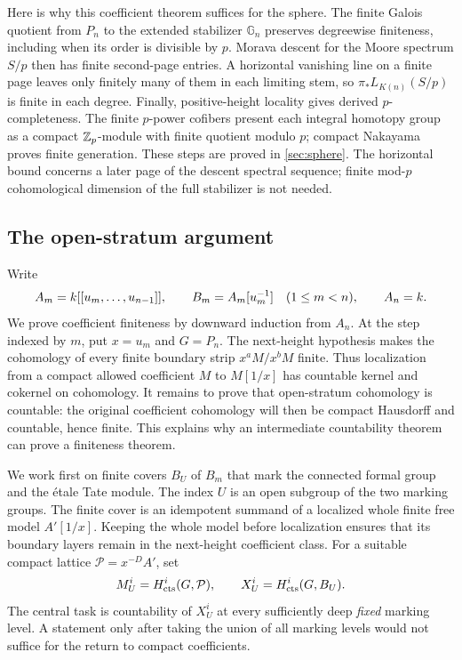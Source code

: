 Here is why this coefficient theorem suffices for the sphere.
The finite Galois quotient from $P_n$ to the extended stabilizer
$\mathbb G_n$ preserves degreewise finiteness, including when its
order is divisible by $p$. Morava descent for the Moore spectrum
$S/p$ then has finite second-page entries. A horizontal vanishing
line on a finite page leaves only finitely many of them in each
limiting stem, so $\pi_*L_{K(n)}(S/p)$ is finite in each degree.
Finally, positive-height locality gives derived $p$-completeness.
The finite $p$-power cofibers present each integral homotopy group
as a compact $\mathbb Z_p$-module with finite quotient modulo $p$; compact
Nakayama proves finite generation. These steps are proved in
\cref{sec:sphere}. The horizontal bound concerns a later page of
the descent spectral sequence; finite mod-$p$ cohomological
dimension of the full stabilizer is not needed.

\subsection{The open-stratum argument}

Write
\[
 A_m=k[[u_m,\ldots,u_{n-1}]],\qquad
 B_m=A_m[u_m^{-1}]\quad(1\leq m<n),\qquad A_n=k.
\]
We prove coefficient finiteness by downward induction from $A_n$.
At the step indexed by $m$, put $x=u_m$ and $G=P_n$.
The next-height hypothesis makes the cohomology of every finite
boundary strip $x^aM/x^bM$ finite. Thus localization from a compact
allowed coefficient $M$ to $M[1/x]$ has countable kernel and
cokernel on cohomology. It remains to prove that open-stratum
cohomology is countable: the original coefficient cohomology will
then be compact Hausdorff and countable, hence finite. This explains why an
intermediate countability theorem can prove a finiteness theorem.

We work first on finite covers $B_U$ of $B_m$ that mark the
connected formal group and the \'etale Tate module. The index $U$
is an open subgroup of the two marking groups. The finite cover
is an idempotent summand of a localized whole finite free model
$A'[1/x]$. Keeping the whole model before localization ensures
that its boundary layers remain in the next-height coefficient
class. For a suitable compact lattice $\mathcal P=x^{-D}A'$, set
\[
 M^i_U=H^i_{\mathrm{cts}}(G,\mathcal P),\qquad
 X^i_U=H^i_{\mathrm{cts}}(G,B_U).
\]
The central task is countability of $X^i_U$ at every sufficiently
deep \emph{fixed} marking level. A statement only after taking the
union of all marking levels would not suffice for the return to
compact coefficients.


